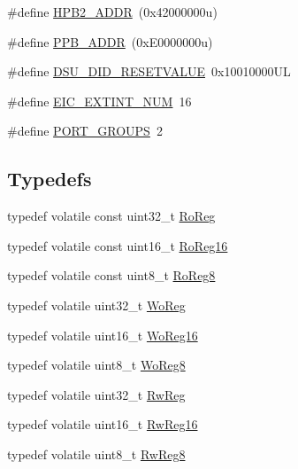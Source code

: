 \begin{DoxyCompactItemize}
\item 
\#define \mbox{\hyperlink{group___s_a_m_d21_j18_a__definitions_gaef42fa53ddf169a2a50be70d29f73571}{H\+P\+B2\+\_\+\+A\+D\+DR}}~(0x42000000u)
\item 
\#define \mbox{\hyperlink{group___s_a_m_d21_j18_a__definitions_ga8895d0a3a9a3126cc44330f86c8ce564}{P\+P\+B\+\_\+\+A\+D\+DR}}~(0x\+E0000000u)
\item 
\#define \mbox{\hyperlink{group___s_a_m_d21_j18_a__definitions_gada75131d542c9e1966238f5488f89bd6}{D\+S\+U\+\_\+\+D\+I\+D\+\_\+\+R\+E\+S\+E\+T\+V\+A\+L\+UE}}~0x10010000\+UL
\item 
\#define \mbox{\hyperlink{group___s_a_m_d21_j18_a__definitions_ga88ebc38c95506296f5d21f82476296ae}{E\+I\+C\+\_\+\+E\+X\+T\+I\+N\+T\+\_\+\+N\+UM}}~16
\item 
\#define \mbox{\hyperlink{group___s_a_m_d21_j18_a__definitions_gab9243ffe03a1dc631b57a495b4b3d467}{P\+O\+R\+T\+\_\+\+G\+R\+O\+U\+PS}}~2
\end{DoxyCompactItemize}
\subsection*{Typedefs}
\begin{DoxyCompactItemize}
\item 
typedef volatile const uint32\+\_\+t \mbox{\hyperlink{group___s_a_m_d21_j18_a__definitions_ga5d556f8391af4141be23f7334ac9dd68}{Ro\+Reg}}
\item 
typedef volatile const uint16\+\_\+t \mbox{\hyperlink{group___s_a_m_d21_j18_a__definitions_gaebf6e33c2d49a802e06e22a95ea9d0d0}{Ro\+Reg16}}
\item 
typedef volatile const uint8\+\_\+t \mbox{\hyperlink{group___s_a_m_d21_j18_a__definitions_ga0d957f1433aaf5d70e4dc2b68288442d}{Ro\+Reg8}}
\item 
typedef volatile uint32\+\_\+t \mbox{\hyperlink{group___s_a_m_d21_j18_a__definitions_gac0f96d4e8018367b38f527007cf0eafd}{Wo\+Reg}}
\item 
typedef volatile uint16\+\_\+t \mbox{\hyperlink{group___s_a_m_d21_j18_a__definitions_ga0ab0e5f6c8301aa1c2068e511d854094}{Wo\+Reg16}}
\item 
typedef volatile uint8\+\_\+t \mbox{\hyperlink{group___s_a_m_d21_j18_a__definitions_ga5e336e5a36ee12ebeafb021108e5275b}{Wo\+Reg8}}
\item 
typedef volatile uint32\+\_\+t \mbox{\hyperlink{group___s_a_m_d21_j18_a__definitions_gacf1496e3bbe303e55f627fc7558a68c7}{Rw\+Reg}}
\item 
typedef volatile uint16\+\_\+t \mbox{\hyperlink{group___s_a_m_d21_j18_a__definitions_gacce07556c80fc352ae607f225f19fed5}{Rw\+Reg16}}
\item 
typedef volatile uint8\+\_\+t \mbox{\hyperlink{group___s_a_m_d21_j18_a__definitions_gae361754be775bb192f85821d3ab33c17}{Rw\+Reg8}}
\end{DoxyCompactItemize}



